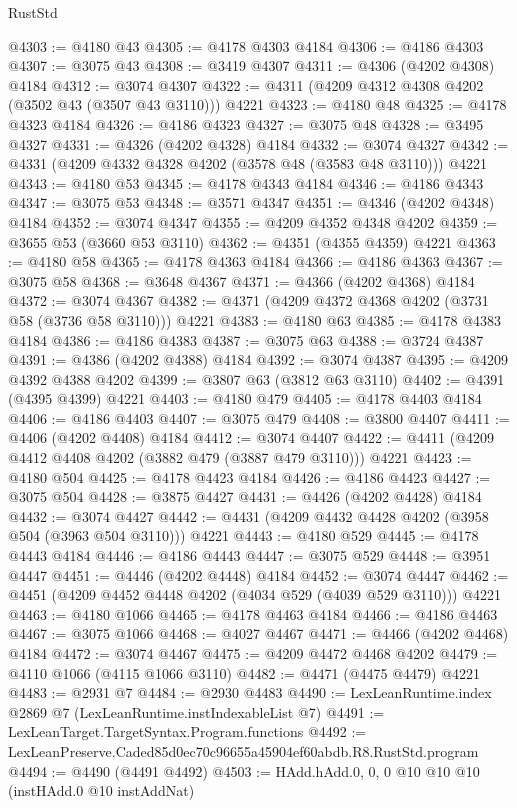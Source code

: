 \begin{lexlean}{RustStd}
\begin{coremodule}
@4303 := @4180 @43
@4305 := @4178 @4303 @4184
@4306 := @4186 @4303
@4307 := @3075 @43
@4308 := @3419 @4307
@4311 := @4306 (@4202 @4308) @4184
@4312 := @3074 @4307
@4322 := @4311 (@4209 @4312 @4308 @4202 (@3502 @43 (@3507 @43 @3110))) @4221
@4323 := @4180 @48
@4325 := @4178 @4323 @4184
@4326 := @4186 @4323
@4327 := @3075 @48
@4328 := @3495 @4327
@4331 := @4326 (@4202 @4328) @4184
@4332 := @3074 @4327
@4342 := @4331 (@4209 @4332 @4328 @4202 (@3578 @48 (@3583 @48 @3110))) @4221
@4343 := @4180 @53
@4345 := @4178 @4343 @4184
@4346 := @4186 @4343
@4347 := @3075 @53
@4348 := @3571 @4347
@4351 := @4346 (@4202 @4348) @4184
@4352 := @3074 @4347
@4355 := @4209 @4352 @4348 @4202
@4359 := @3655 @53 (@3660 @53 @3110)
@4362 := @4351 (@4355 @4359) @4221
@4363 := @4180 @58
@4365 := @4178 @4363 @4184
@4366 := @4186 @4363
@4367 := @3075 @58
@4368 := @3648 @4367
@4371 := @4366 (@4202 @4368) @4184
@4372 := @3074 @4367
@4382 := @4371 (@4209 @4372 @4368 @4202 (@3731 @58 (@3736 @58 @3110))) @4221
@4383 := @4180 @63
@4385 := @4178 @4383 @4184
@4386 := @4186 @4383
@4387 := @3075 @63
@4388 := @3724 @4387
@4391 := @4386 (@4202 @4388) @4184
@4392 := @3074 @4387
@4395 := @4209 @4392 @4388 @4202
@4399 := @3807 @63 (@3812 @63 @3110)
@4402 := @4391 (@4395 @4399) @4221
@4403 := @4180 @479
@4405 := @4178 @4403 @4184
@4406 := @4186 @4403
@4407 := @3075 @479
@4408 := @3800 @4407
@4411 := @4406 (@4202 @4408) @4184
@4412 := @3074 @4407
@4422 := @4411 (@4209 @4412 @4408 @4202 (@3882 @479 (@3887 @479 @3110))) @4221
@4423 := @4180 @504
@4425 := @4178 @4423 @4184
@4426 := @4186 @4423
@4427 := @3075 @504
@4428 := @3875 @4427
@4431 := @4426 (@4202 @4428) @4184
@4432 := @3074 @4427
@4442 := @4431 (@4209 @4432 @4428 @4202 (@3958 @504 (@3963 @504 @3110))) @4221
@4443 := @4180 @529
@4445 := @4178 @4443 @4184
@4446 := @4186 @4443
@4447 := @3075 @529
@4448 := @3951 @4447
@4451 := @4446 (@4202 @4448) @4184
@4452 := @3074 @4447
@4462 := @4451 (@4209 @4452 @4448 @4202 (@4034 @529 (@4039 @529 @3110))) @4221
@4463 := @4180 @1066
@4465 := @4178 @4463 @4184
@4466 := @4186 @4463
@4467 := @3075 @1066
@4468 := @4027 @4467
@4471 := @4466 (@4202 @4468) @4184
@4472 := @3074 @4467
@4475 := @4209 @4472 @4468 @4202
@4479 := @4110 @1066 (@4115 @1066 @3110)
@4482 := @4471 (@4475 @4479) @4221
@4483 := @2931 @7
@4484 := @2930 @4483
@4490 := LexLeanRuntime.index @2869 @7 (LexLeanRuntime.instIndexableList @7)
@4491 := LexLeanTarget.TargetSyntax.Program.functions
@4492 := LexLeanPreserve.Caded85d0ec70c96655a45904ef60abdb.R8.RustStd.program
@4494 := @4490 (@4491 @4492)
@4503 := HAdd.hAdd.{0, 0, 0} @10 @10 @10 (instHAdd.{0} @10 instAddNat)

\end{coremodule}
\end{lexlean}
